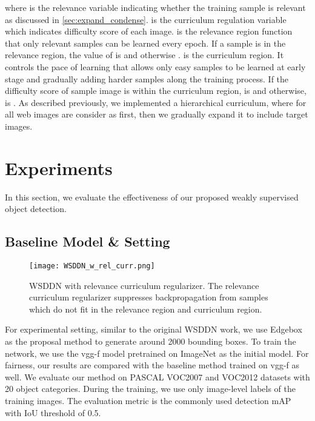 \documentclass[10pt,twocolumn,letterpaper]{article}
\begin{document}
where  is the relevance variable indicating whether the training sample is relevant as discussed in \ref{sec:expand_condense}.  is the curriculum regulation variable which indicates difficulty score of each image.  is the relevance region function that only relevant samples can be learned every epoch. If a sample is in the relevance region, the value of  is  and otherwise .  is the curriculum region. It controls the pace of learning that allows only easy samples to be learned at early stage and gradually adding harder samples along the training process. If the difficulty score of sample image is within the curriculum region,  is  and otherwise,  is . As described previously, we implemented a hierarchical curriculum, where  for all web images are consider as  first, then we gradually expand it to include target images.







\section {Experiments}
\label{exp}
In this section, we evaluate the effectiveness of our proposed weakly supervised object detection.

\subsection {Baseline Model \& Setting}
\begin{figure}[t]
\texttt{[image: WSDDN\_w\_rel\_curr.png]}
\caption{WSDDN with relevance curriculum regularizer. The relevance curriculum regularizer suppresses backpropagation from samples which do not fit in the relevance region and curriculum region. }
\label{fig:wsddn_w_curr_rel}
\end{figure}




For experimental setting, similar to the original WSDDN work, we use Edgebox~\cite{zitnick2014edge} as the proposal method to generate around 2000 bounding boxes. To train the network, we use the vgg-f model pretrained on ImageNet as the initial model. For fairness, our results are compared with the baseline method trained on vgg-f as well. 
We evaluate our method on PASCAL VOC2007 and VOC2012 datasets with 20 object categories. During the training, we use only image-level labels of the training images. The evaluation metric is the commonly used detection mAP with IoU threshold of 0.5.
\end{document}
